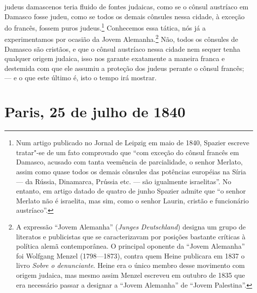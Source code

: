 judeus damascenos teria fluido de fontes judaicas, como se o cônsul
austríaco em Damasco fosse judeu, como se todos os demais cônsules
nessa cidade, à exceção do francês, fossem puros judeus.\footnote{ Num
artigo publicado no Jornal de Leipzig em maio de 1840, Spazier escreve
tratar"-se de um fato comprovado que “com exceção do cônsul francês em
Damasco, acusado com tanta veemência de parcialidade, o senhor Merlato,
assim como quase todos os demais cônsules das potências européias na
Síria --- da Rússia, Dinamarca, Prússia etc. --- são igualmente 
israelitas”. No entanto, em artigo datado de quatro de junho Spazier
admite que “o senhor Merlato não é israelita, mas sim, como o senhor
Laurin, cristão e funcionário austríaco”.} Conhecemos essa
tática, nós já a experimentamos por ocasião da Jovem
Alemanha.\footnote{ A expressão “Jovem Alemanha” (\textit{Junges
Deutschland}) designa um grupo de literatos e publicistas que se
caracterizavam por posições bastante críticas à política alemã
contemporânea. O principal oponente da “Jovem Alemanha” foi Wolfgang
Menzel (1798---1873), contra quem Heine publicara em 1837 o livro
\textit{Sobre o denunciante}. Heine era o único membro desse movimento
com origem judaica, mas mesmo assim Menzel escreveu em outubro de 1835
que era necessário passar a designar a “Jovem Alemanha” de “Jovem
Palestina”.} Não, todos os cônsules de Damasco são cristãos, e
que o cônsul austríaco nessa cidade nem sequer tenha qualquer origem
judaica, isso nos garante exatamente a maneira franca e destemida com
que ele assumiu a proteção dos judeus perante o cônsul francês; --- e o
que este último é, isto o tempo irá mostrar.


\chapter{Paris, 25 de julho de 1840}

